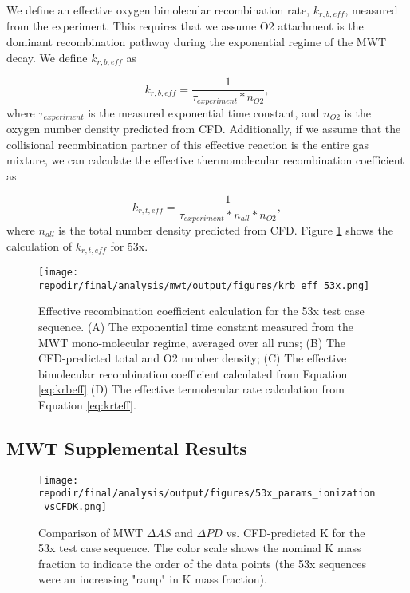 We define an effective oxygen bimolecular recombination rate, $k_{r,b,eff}$, measured from the experiment. This requires that we assume O2 attachment is the dominant recombination pathway during the exponential regime of the MWT decay. We define $k_{r,b,eff}$ as 

\begin{equation}
    \label{eq:krbeff}
    k_{r,b,eff} = \frac{1}{\tau_{experiment} *  n_{O2}},
\end{equation}
where $\tau_{experiment}$ is the measured exponential time constant,  and $n_{O2}$ is the oxygen number density predicted from CFD. Additionally, if we assume that the collisional recombination partner of this effective reaction is the entire gas mixture, we can calculate the effective thermomolecular recombination coefficient as


\begin{equation}
    \label{eq:krteff}
    k_{r,t,eff} = \frac{1}{\tau_{experiment} * n_{all} *  n_{O2}},
\end{equation}
where $n_{all}$ is the total number density predicted from CFD. Figure \ref{fig:SI_krb_eff_53x} shows the calculation of $k_{r,t,eff}$ for 53x.

\begin{figure}[]
\centering
\texttt{[image: \\repodir/final/analysis/mwt/output/figures/krb\_eff\_53x.png]}
\caption{Effective recombination coefficient calculation for the 53x test case sequence. (A) The exponential time constant measured from the MWT mono-molecular regime, averaged over all runs; (B) The CFD-predicted total and O2 number density; (C) The effective bimolecular recombination coefficient calculated from Equation \ref{eq:krbeff} (D) The effective termolecular rate calculation from Equation \ref{eq:krteff}.}
\label{fig:SI_krb_eff_53x}
\end{figure}

\clearpage
\subsection{MWT Supplemental Results}

\begin{figure}[h]
    \centering
    \texttt{[image: \\repodir/final/analysis/output/figures/53x\_params\_ionization\_vsCFDK.png]} 
    \caption{Comparison of MWT $\Delta AS$ and $\Delta PD$ vs. CFD-predicted K for the 53x test case sequence. The color scale shows the nominal K mass fraction to indicate the order of the data points (the 53x sequences were an increasing "ramp" in K mass fraction).}
    \label{fig:SI_53x_params_ionization_vsCFDK}
\end{figure}

